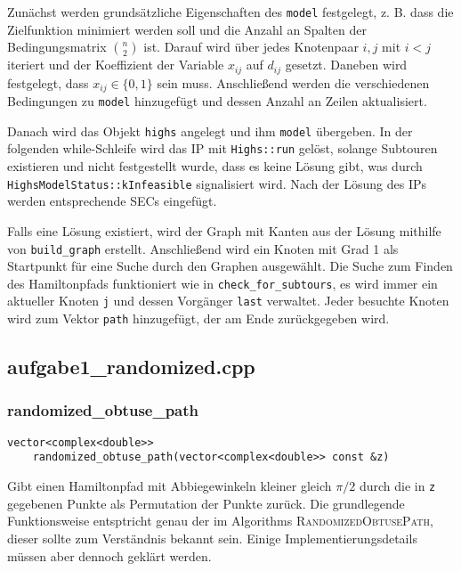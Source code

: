 \documentclass[a4paper, 10pt, ngerman]{article}
\begin{document}
Zunächst werden grundsätzliche Eigenschaften des \verb|model| festgelegt, z. B. dass die Zielfunktion minimiert werden soll und die Anzahl an Spalten der Bedingungsmatrix $\binom n 2$ ist. Darauf wird über jedes Knotenpaar $i, j$ mit $i < j$ iteriert und der Koeffizient der Variable $x_{ij}$ auf $d_{ij}$ gesetzt. Daneben wird festgelegt, dass $x_{ij} \in \{0, 1\}$ sein muss. Anschließend werden die verschiedenen Bedingungen zu \verb|model| hinzugefügt und dessen Anzahl an Zeilen aktualisiert.

Danach wird das Objekt \verb|highs| angelegt und ihm \verb|model| übergeben. In der folgenden while-Schleife wird das IP mit \verb|Highs::run| gelöst, solange Subtouren existieren und nicht festgestellt wurde, dass es keine Lösung gibt, was durch \verb|HighsModelStatus::kInfeasible| signalisiert wird. Nach der Lösung des IPs werden entsprechende SECs eingefügt.

Falls eine Lösung existiert, wird der Graph mit Kanten aus der Lösung mithilfe von \verb|build_graph| erstellt. Anschließend wird ein Knoten mit Grad 1 als Startpunkt für eine Suche durch den Graphen ausgewählt. Die Suche zum Finden des Hamiltonpfads funktioniert wie in \verb|check_for_subtours|, es wird immer ein aktueller Knoten \verb|j| und dessen Vorgänger \verb|last| verwaltet. Jeder besuchte Knoten wird zum Vektor \verb|path| hinzugefügt, der am Ende zurückgegeben wird.

\subsection{aufgabe1\_randomized.cpp}

\subsubsection{randomized\_obtuse\_path}

\verb|vector<complex<double>>| \\
\verb|    randomized_obtuse_path(vector<complex<double>> const &z)|
\medskip

\noindent Gibt einen Hamiltonpfad mit Abbiegewinkeln kleiner gleich $\pi / 2$ durch die in \verb|z| gegebenen Punkte als Permutation der Punkte zurück. Die grundlegende Funktionsweise entsptricht genau der im Algorithms \textsc{RandomizedObtusePath}, dieser sollte zum Verständnis bekannt sein. Einige Implementierungsdetails müssen aber dennoch geklärt werden.
\end{document}
